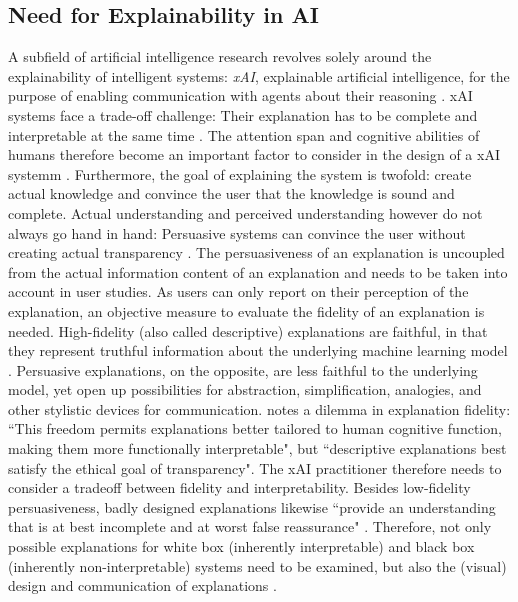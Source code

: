 \subsection{Need for Explainability in AI}
\label{subsec:explainability}
A subfield of artificial intelligence research revolves solely around the explainability of intelligent systems: \textit{xAI}, explainable artificial intelligence, for the purpose of enabling communication with agents about their reasoning \cite{hendricks2018generating}. xAI systems face a trade-off challenge: Their explanation has to be complete and interpretable at the same time \cite{gilpin2018explaining}. The attention span and cognitive abilities of humans therefore become an important factor to consider in the design of a xAI systemm \cite{kulesza2013too}. Furthermore, the goal of explaining the system is twofold: create actual knowledge and convince the user that the knowledge is sound and complete. Actual understanding and perceived understanding however do not always go hand in hand: Persuasive systems can convince the user without creating actual transparency \cite{gilpin2018explaining}. The persuasiveness of an explanation is uncoupled from the actual information content of an explanation \cite{biran2017explanation} and needs to be taken into account in user studies. As users can only report on their perception of the explanation, an objective measure to evaluate the fidelity of an explanation is needed. High-fidelity (also called descriptive) explanations are faithful, in that they represent truthful information about the underlying machine learning model \cite{herman2017promise}. Persuasive explanations, on the opposite, are less faithful to the underlying model, yet open up possibilities for abstraction, simplification, analogies, and other stylistic devices for communication. \cite{herman2017promise} notes a dilemma in explanation fidelity: ``This freedom permits explanations better tailored to human cognitive function, making them more functionally interpretable", but ``descriptive explanations best satisfy the ethical goal of transparency". The xAI practitioner therefore needs to consider a tradeoff between fidelity and interpretability. \newline 
Besides low-fidelity persuasiveness, badly designed explanations likewise ``provide an understanding that is at best incomplete and at worst false reassurance" \cite{burrell2016machine}. Therefore, not only possible explanations for white box (inherently interpretable) and black box (inherently non-interpretable) systems need to be examined, but also the (visual) design and communication of explanations \cite{guidotti2018survey}. \newline
